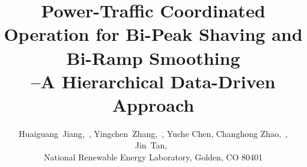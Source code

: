 \documentclass[final]{IEEEtran}
\begin{document}
\title{\Large  Power-Traffic Coordinated Operation for Bi-Peak Shaving and Bi-Ramp Smoothing \\ --A Hierarchical Data-Driven Approach}


\author{\large Huaiguang~Jiang,~, Yingchen~Zhang,~, Yuche Chen, Changhong Zhao,~, Jin~Tan,~ 

{\normalsize National Renewable Energy Laboratory, Golden, CO 80401}
\vspace{-0.3in}

}


\date{}
\maketitle
\end{document}
